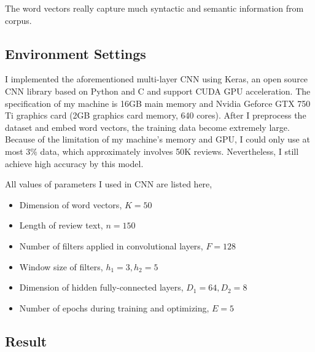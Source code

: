 \documentclass[11pt]{article}
\theoremstyle{definition}
\theoremstyle{basic}
\begin{document}
The word vectors really capture much syntactic and semantic information from corpus.

\subsection{Environment Settings}

I implemented the aforementioned multi-layer CNN using Keras, an open source CNN library based on Python and C and support CUDA GPU acceleration.
The specification of my machine is 16GB main memory and Nvidia Geforce GTX 750 Ti graphics card (2GB graphics card memory, 640 cores).
After I preprocess the dataset and embed word vectors, the training data become extremely large.
Because of the limitation of my machine's memory and GPU, I could only use at most 3\% data, which approximately involves 50K reviews. 
Nevertheless, I still achieve high accuracy by this model.

All values of parameters I used in CNN are listed here,

\begin{itemize}
    \item Dimension of word vectors, $K = 50$
    \item Length of review text, $n = 150$
    \item Number of filters applied in convolutional layers, $F = 128$
    \item Window size of filters, $h_1 = 3, h_2 = 5$
    \item Dimension of hidden fully-connected layers, $D_1 = 64, D_2 = 8$
    \item Number of epochs during training and optimizing, $E = 5$
\end{itemize}

\subsection{Result}

\begin{table}
\centering
{}
\caption{Accuracy - training size of binary classification on reviews with 1, 2, 4, 5 stars}
\label{tableA}
\end{table}
\end{document}
